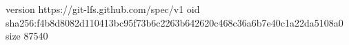version https://git-lfs.github.com/spec/v1
oid sha256:f4b8d8082d110413bc95f73b6c2263b642620c468c36a6b7e40c1a22da5108a0
size 87540
